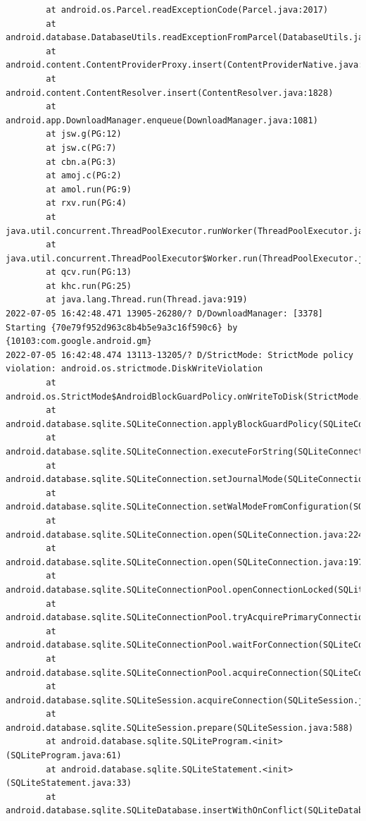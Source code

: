 \documentclass[a4paper,12pt]{book}
\begin{document}
\begin{lstlisting}
        at android.os.Parcel.readExceptionCode(Parcel.java:2017)
        at android.database.DatabaseUtils.readExceptionFromParcel(DatabaseUtils.java:137)
        at android.content.ContentProviderProxy.insert(ContentProviderNative.java:481)
        at android.content.ContentResolver.insert(ContentResolver.java:1828)
        at android.app.DownloadManager.enqueue(DownloadManager.java:1081)
        at jsw.g(PG:12)
        at jsw.c(PG:7)
        at cbn.a(PG:3)
        at amoj.c(PG:2)
        at amol.run(PG:9)
        at rxv.run(PG:4)
        at java.util.concurrent.ThreadPoolExecutor.runWorker(ThreadPoolExecutor.java:1167)
        at java.util.concurrent.ThreadPoolExecutor$Worker.run(ThreadPoolExecutor.java:641)
        at qcv.run(PG:13)
        at khc.run(PG:25)
        at java.lang.Thread.run(Thread.java:919)
2022-07-05 16:42:48.471 13905-26280/? D/DownloadManager: [3378] Starting {70e79f952d963c8b4b5e9a3c16f590c6} by {10103:com.google.android.gm}
2022-07-05 16:42:48.474 13113-13205/? D/StrictMode: StrictMode policy violation: android.os.strictmode.DiskWriteViolation
        at android.os.StrictMode$AndroidBlockGuardPolicy.onWriteToDisk(StrictMode.java:1527)
        at android.database.sqlite.SQLiteConnection.applyBlockGuardPolicy(SQLiteConnection.java:1140)
        at android.database.sqlite.SQLiteConnection.executeForString(SQLiteConnection.java:733)
        at android.database.sqlite.SQLiteConnection.setJournalMode(SQLiteConnection.java:376)
        at android.database.sqlite.SQLiteConnection.setWalModeFromConfiguration(SQLiteConnection.java:316)
        at android.database.sqlite.SQLiteConnection.open(SQLiteConnection.java:224)
        at android.database.sqlite.SQLiteConnection.open(SQLiteConnection.java:197)
        at android.database.sqlite.SQLiteConnectionPool.openConnectionLocked(SQLiteConnectionPool.java:505)
        at android.database.sqlite.SQLiteConnectionPool.tryAcquirePrimaryConnectionLocked(SQLiteConnectionPool.java:949)
        at android.database.sqlite.SQLiteConnectionPool.waitForConnection(SQLiteConnectionPool.java:699)
        at android.database.sqlite.SQLiteConnectionPool.acquireConnection(SQLiteConnectionPool.java:380)
        at android.database.sqlite.SQLiteSession.acquireConnection(SQLiteSession.java:896)
        at android.database.sqlite.SQLiteSession.prepare(SQLiteSession.java:588)
        at android.database.sqlite.SQLiteProgram.<init>(SQLiteProgram.java:61)
        at android.database.sqlite.SQLiteStatement.<init>(SQLiteStatement.java:33)
        at android.database.sqlite.SQLiteDatabase.insertWithOnConflict(SQLiteDatabase.java:1597)

\end{lstlisting}
\end{document}

